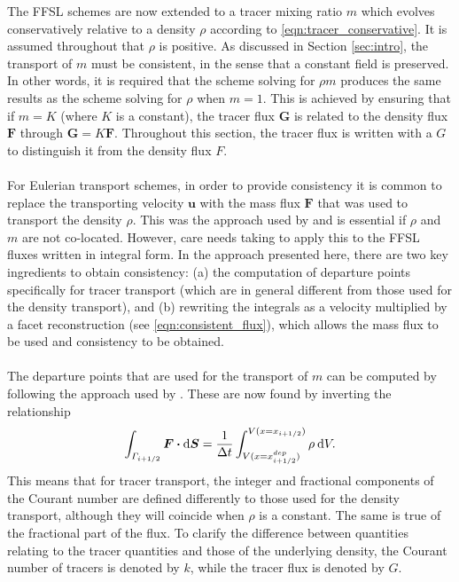 \documentclass{ametsocV6.1}
\newcommand{\dx}[1]{\hspace{0.75mm}\mathrm{d}{#1}}
\begin{document}
The FFSL schemes are now extended to a tracer mixing ratio $m$ which evolves conservatively relative to a density $\rho$ according to \eqref{eqn:tracer_conservative}.
It is assumed throughout that $\rho$ is positive.
As discussed in Section \ref{sec:intro}, the transport of $m$ must be consistent, in the sense that a constant field is preserved.
In other words, it is required that the scheme solving for $\rho m$ produces the same results as the scheme solving for $\rho$ when $m=1$.
This is achieved by ensuring that if $m=K$ (where $K$ is a constant), the tracer flux $\bm{G}$ is related to the density flux $\bm{F}$ through $\bm{G}=K\bm{F}$.
Throughout this section, the tracer flux is written with a $G$ to distinguish it from the density flux $F$.
\\
\\
For Eulerian transport schemes, in order to provide consistency it is common to replace the transporting velocity $\bm{u}$ with the mass flux $\bm{F}$ that was used to transport the density $\rho$. This was the approach used by \citet{bendall2023solution} and is essential if $\rho$ and $m$ are not co-located.
However, care needs taking to apply this to the FFSL fluxes written in integral form.
In the approach presented here, there are two key ingredients to obtain consistency:
(a) the computation of departure points specifically for tracer transport (which are in general different from those used for the density transport), and (b) rewriting the integrals as a velocity multiplied by a facet reconstruction (see \eqref{eqn:consistent_flux}), which allows the mass flux to be used and consistency to be obtained. \\
\\
The departure points that are used for the transport of $m$ can be computed by following the approach used by \cite{skamarock2006limiters}.
These are now found by inverting the relationship
\begin{equation}
\int_{\varGamma_{i+1/2}} \bm{F} \bm{\cdot} \mathrm{d}\bm{S} = \frac{1}{\Delta t} \int_{V(x=x^{dep}_{i+1/2})}^{V(x=x_{i+1/2})} \rho \dx{V}.
\end{equation}
This means that for tracer transport, the integer and fractional components of the Courant number are defined differently to those used for the density transport, although they will coincide when $\rho$ is a constant.
The same is true of the fractional part of the flux.
To clarify the difference between quantities relating to the tracer quantities and those of the underlying density,
the Courant number of tracers is denoted by $k$, while the tracer flux is denoted by $G$.
\end{document}

